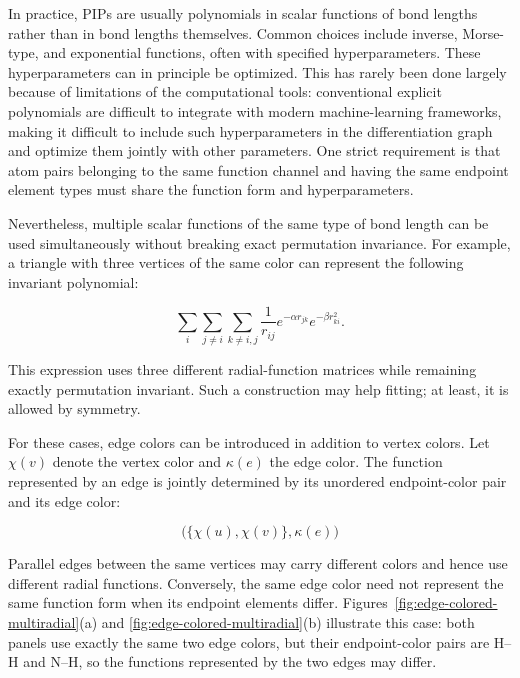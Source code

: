 In practice, PIPs are usually polynomials in scalar functions of bond lengths rather than in bond lengths themselves. Common choices include inverse, Morse-type, and exponential functions, often with specified hyperparameters. These hyperparameters can in principle be optimized. This has rarely been done largely because of limitations of the computational tools: conventional explicit polynomials are difficult to integrate with modern machine-learning frameworks, making it difficult to include such hyperparameters in the differentiation graph and optimize them jointly with other parameters. One strict requirement is that atom pairs belonging to the same function channel and having the same endpoint element types must share the function form and hyperparameters.

Nevertheless, multiple scalar functions of the same type of bond length can be used simultaneously without breaking exact permutation invariance. For example, a triangle with three vertices of the same color can represent the following invariant polynomial:

\[
\sum_i\sum_{j\neq i}\sum_{k\neq i,j}
\frac{1}{r_{ij}}e^{-\alpha r_{jk}}e^{-\beta r_{ki}^{2}}.
\]

This expression uses three different radial-function matrices while remaining exactly permutation invariant. Such a construction may help fitting; at least, it is allowed by symmetry\cite{hao2026SRI}.

For these cases, edge colors can be introduced in addition to vertex colors. Let \(\chi(v)\) denote the vertex color and \(\kappa(e)\) the edge color. The function represented by an edge is jointly determined by its unordered endpoint-color pair and its edge color:

\[
\bigl(\{\chi(u),\chi(v)\},\kappa(e)\bigr)
\]

Parallel edges between the same vertices may carry different colors and hence use different radial functions. Conversely, the same edge color need not represent the same function form when its endpoint elements differ. Figures~\ref{fig:edge-colored-multiradial}(a) and \ref{fig:edge-colored-multiradial}(b) illustrate this case: both panels use exactly the same two edge colors, but their endpoint-color pairs are H--H and N--H, so the functions represented by the two edges may differ.

